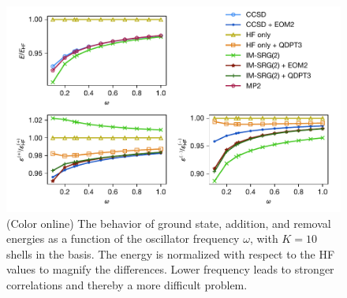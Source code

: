 \begin{figure}
  \centering
  \includegraphics{fig-by-freq-10-6-normal.pdf}
  \caption{(Color online) The behavior of ground state, addition, and removal energies as a function of the oscillator frequency $\omega$, with $K = 10$ shells in the basis.  The energy is normalized with respect to the HF values to magnify the differences.  Lower frequency leads to stronger correlations and thereby a more difficult problem.}
  \label{fig:by-freq-10-6-normal}
\end{figure}

